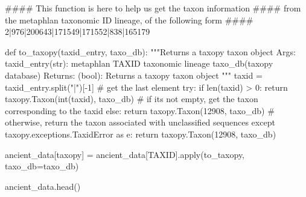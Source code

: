 \documentclass[
  letterpaper,
]{book}
\newenvironment{Shaded}{}{}
\newcommand{\BuiltInTok}[1]{\textcolor[rgb]{0.84,0.23,0.29}{#1}}
\newcommand{\CommentTok}[1]{\textcolor[rgb]{0.42,0.45,0.49}{#1}}
\newcommand{\ControlFlowTok}[1]{\textcolor[rgb]{0.84,0.23,0.29}{#1}}
\newcommand{\DecValTok}[1]{\textcolor[rgb]{0.00,0.36,0.77}{#1}}
\newcommand{\ImportTok}[1]{\textcolor[rgb]{0.01,0.18,0.38}{#1}}
\newcommand{\KeywordTok}[1]{\textcolor[rgb]{0.84,0.23,0.29}{#1}}
\newcommand{\NormalTok}[1]{\textcolor[rgb]{0.14,0.16,0.18}{#1}}
\newcommand{\OperatorTok}[1]{\textcolor[rgb]{0.14,0.16,0.18}{#1}}
\newcommand{\StringTok}[1]{\textcolor[rgb]{0.01,0.18,0.38}{#1}}
\begin{document}
\begin{Shaded}
\begin{Highlighting}[]
\CommentTok{\#\#\#\# This function is here to help us get the taxon information}
\CommentTok{\#\#\#\# from the metaphlan taxonomic ID lineage, of the following form}
\CommentTok{\#\#\#\# 2|976|200643|171549|171552|838|165179}

\KeywordTok{def}\NormalTok{ to\_taxopy(taxid\_entry, taxo\_db):}
    \CommentTok{"""Returns a taxopy taxon object}
\CommentTok{    Args:}
\CommentTok{        taxid\_entry(str): metaphlan TAXID taxonomic lineage}
\CommentTok{        taxo\_db(taxopy database)}
\CommentTok{    Returns:}
\CommentTok{        (bool): Returns a taxopy taxon object}
\CommentTok{    """}
\NormalTok{    taxid }\OperatorTok{=}\NormalTok{ taxid\_entry.split(}\StringTok{"|"}\NormalTok{)[}\OperatorTok{{-}}\DecValTok{1}\NormalTok{] }\CommentTok{\# get the last element}
    \ControlFlowTok{try}\NormalTok{:}
        \ControlFlowTok{if} \BuiltInTok{len}\NormalTok{(taxid) }\OperatorTok{\textgreater{}} \DecValTok{0}\NormalTok{:}
            \ControlFlowTok{return}\NormalTok{ taxopy.Taxon(}\BuiltInTok{int}\NormalTok{(taxid), taxo\_db) }\CommentTok{\# if it\textquotesingle{}s not empty, get the taxon corresponding to the taxid}
        \ControlFlowTok{else}\NormalTok{:}
            \ControlFlowTok{return}\NormalTok{ taxopy.Taxon(}\DecValTok{12908}\NormalTok{, taxo\_db) }\CommentTok{\# otherwise, return the taxon associated with unclassified sequences}
    \ControlFlowTok{except}\NormalTok{ taxopy.exceptions.TaxidError }\ImportTok{as}\NormalTok{ e:}
        \ControlFlowTok{return}\NormalTok{ taxopy.Taxon(}\DecValTok{12908}\NormalTok{, taxo\_db)}
\end{Highlighting}
\end{Shaded}

\begin{Shaded}
\begin{Highlighting}[]
\NormalTok{ancient\_data[}\StringTok{\textquotesingle{}taxopy\textquotesingle{}}\NormalTok{] }\OperatorTok{=}\NormalTok{ ancient\_data[}\StringTok{\textquotesingle{}TAXID\textquotesingle{}}\NormalTok{].}\BuiltInTok{apply}\NormalTok{(to\_taxopy, taxo\_db}\OperatorTok{=}\NormalTok{taxo\_db)}
\end{Highlighting}
\end{Shaded}

\begin{Shaded}
\begin{Highlighting}[]
\NormalTok{ancient\_data.head()}
\end{Highlighting}
\end{Shaded}
\end{document}
